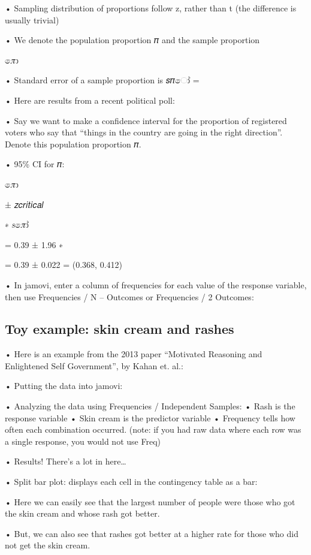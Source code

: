 \documentclass[
  letterpaper,
  DIV=11,
  numbers=noendperiod]{scrreprt}
\begin{document}
• Sampling distribution of proportions follow z, rather than t (the
difference is usually trivial)

• We denote the population proportion 𝜋 and the sample proportion

𝜋ො

• Standard error of a sample proportion is 𝑠𝜋ෝ =

• Here are results from a recent political poll:

• Say we want to make a confidence interval for the proportion of
registered voters who say that ``things in the country are going in the
right direction''. Denote this population proportion 𝜋.

• 95\% CI for 𝜋:

𝜋ො

± 𝑧𝑐𝑟𝑖𝑡𝑖𝑐𝑎𝑙

∗ 𝑠𝜋ෝ

= 0.39 ± 1.96 ∗

= 0.39 ± 0.022 = (0.368, 0.412)

• In jamovi, enter a column of frequencies for each value of the
response variable, then use Frequencies / N -- Outcomes or Frequencies /
2 Outcomes:

\hypertarget{toy-example-skin-cream-and-rashes}{%
\subsection{Toy example: skin cream and
rashes}\label{toy-example-skin-cream-and-rashes}}

• Here is an example from the 2013 paper ``Motivated Reasoning and
Enlightened Self Government'', by Kahan et. al.:

• Putting the data into jamovi:

• Analyzing the data using Frequencies / Independent Samples: • Rash is
the response variable • Skin cream is the predictor variable • Frequency
tells how often each combination occurred. (note: if you had raw data
where each row was a single response, you would not use Freq)

• Results! There's a lot in here\ldots{}

• Split bar plot: displays each cell in the contingency table as a bar:

• Here we can easily see that the largest number of people were those
who got the skin cream and whose rash got better.

• But, we can also see that rashes got better at a higher rate for those
who did not get the skin cream.
\end{document}

